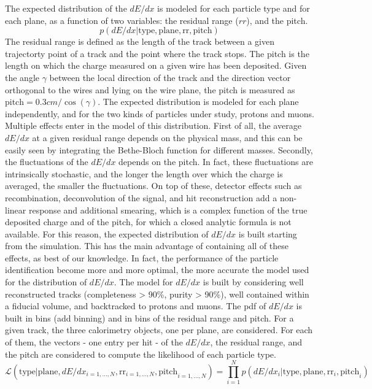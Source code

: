 \documentclass[a4paper]{article}
\begin{document}
The expected distribution of the $dE/dx$ is modeled for each particle type and for each plane, as a function of two variables: the residual range ($rr$), and the pitch.
\[ p(dE/dx | \text{type}, \text{plane}, \text{rr}, \text{pitch}) \]
The residual range is defined as the length of the track between a given trajectorty point of a track and the point where the track stops.
The pitch is the length on which the charge measured on a given wire has been deposited.
Given the angle $\gamma$ between the local direction of the track and the direction vector orthogonal to the wires and lying on the wire plane, the pitch is measured as $\text{pitch} = 0.3 cm / \cos(\gamma) $.
The expected distribution is modeled for each plane independently, and for the two kinds of particles under study, protons and muons.
Multiple effects enter in the model of this distribution.
First of all, the average $dE/dx$ at a given residual range depends on the physical mass, and this can be easily seen by integrating the Bethe-Bloch function for different masses.
Secondly, the fluctuations of the $dE/dx$ depends on the pitch.
In fact, these fluctuations are intrinsically stochastic, and the longer the length over which the charge is averaged, the smaller the fluctuations.
On top of these, detector effects such as recombination, deconvolution of the signal, and hit reconstruction add a non-linear response and additional smearing, which is a complex function of the true deposited charge and of the pitch, for which a closed analytic formula is not available.
For this reason, the expected distribution of $dE/dx$ is built starting from the simulation.
This has the main advantage of containing all of these effects, as best of our knowledge.
In fact, the performance of the particle identification become more and more optimal, the more accurate the model used for the distribution of $dE/dx$.
The model for $dE/dx$ is built by considering well reconstructed tracks (completeness > 90\%, purity > 90\%), well contained within a fiducial volume, and backtracked to protons and muons.
The pdf of $dE/dx$ is built in bins (add binning) and in bins of the residual range and pitch.
For a given track, the three calorimetry objects, one per plane, are considered.
For each of them, the vectors - one entry per hit - of the $dE/dx$, the residual range, and the pitch are considered to compute the likelihood of each particle type.
\[ \mathcal{L}(\text{type} | \text{plane}, dE/dx_{i = 1, ..., N},   \text{rr}_{i = 1, ..., N}, \text{pitch}_{i = 1, ..., N}) = \prod_{i=1}^N p(dE/dx_i | \text{type}, \text{plane}, \text{rr}_i, \text{pitch}_i) \]
\end{document}
